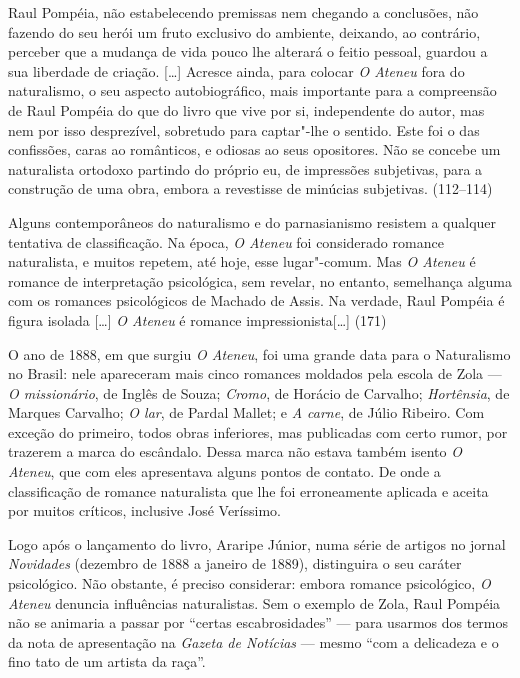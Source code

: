 Raul Pompéia, não estabelecendo premissas nem chegando a
conclusões, não fazendo do seu herói um fruto exclusivo do ambiente,
deixando, ao contrário, perceber que a mudança de vida pouco lhe
alterará o feitio pessoal, guardou a sua liberdade de criação. [\ldots]
Acresce ainda, para colocar \textit{O Ateneu} fora do naturalismo, o seu aspecto
autobiográfico, mais importante para a compreensão de Raul Pompéia
do que do livro que vive por si, independente do autor, mas nem por
isso desprezível, sobretudo para captar"-lhe o sentido. Este foi o das
confissões, caras ao românticos, e odiosas ao seus opositores. Não se
concebe um naturalista ortodoxo partindo do próprio eu, de impressões
subjetivas, para a construção de uma obra, embora a revestisse de
minúcias subjetivas. (112--114)



Alguns contemporâneos do naturalismo e do parnasianismo
resistem a qualquer tentativa de classificação. Na época,
\textit{O Ateneu} foi considerado romance
naturalista, e muitos repetem, até hoje, esse lugar"-comum. Mas
\textit{O Ateneu} é romance de interpretação
psicológica, sem revelar, no entanto, semelhança alguma com os
romances psicológicos de Machado de Assis. Na verdade, Raul Pompéia é
figura isolada [\ldots] \textit{O Ateneu} é
romance impressionista[\ldots] (171)



O ano de 1888, em que surgiu \textit{O
Ateneu}, foi uma grande data para o Naturalismo no
Brasil: nele apareceram mais cinco romances moldados pela escola de
Zola --- \textit{O missionário}, de Inglês
de Souza; \textit{Cromo}, de Horácio de
Carvalho; \textit{Hortênsia}, de Marques
Carvalho; \textit{O lar}, de Pardal Mallet;
e \textit{A carne}, de Júlio Ribeiro. Com
exceção do primeiro, todos obras inferiores, mas publicadas com certo
rumor, por trazerem a marca do escândalo. Dessa marca não estava também
isento \textit{O Ateneu}, que com eles
apresentava alguns pontos de contato. De onde a classificação de
romance naturalista que lhe foi erroneamente aplicada e aceita por
muitos críticos, inclusive José Veríssimo.

Logo após o lançamento do livro, Araripe Júnior, numa
série de artigos no jornal \textit{Novidades} (dezembro de 1888 a
janeiro de 1889), distinguira o seu caráter psicológico. Não obstante,
é preciso considerar: embora romance psicológico, \textit{O Ateneu} 
denuncia influências naturalistas. Sem o exemplo de Zola, Raul Pompéia 
não se animaria a passar por ``certas escabrosidades'' --- 
para usarmos dos termos da nota de apresentação na 
\textit{Gazeta de Notícias} --- mesmo ``com a delicadeza 
e o fino tato de um artista da raça''.

